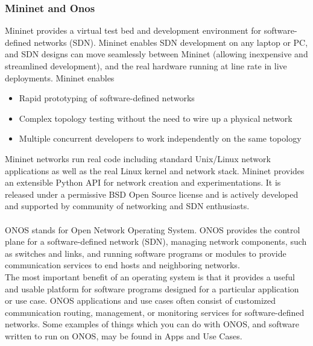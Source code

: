 {{{\subsubsection{Mininet and Onos}{
Mininet provides a virtual test bed and development environment for software-defined networks (SDN). Mininet enables SDN development on any laptop or PC, and SDN designs can move seamlessly between Mininet (allowing inexpensive and streamlined development), and the real hardware running at line rate in live deployments. Mininet enables
\begin{itemize}
\item Rapid prototyping of software-defined networks
\item Complex topology testing without the need to wire up a physical network
\item Multiple concurrent developers to work independently on the same topology
\end{itemize}
Mininet networks run real code including standard Unix/Linux network applications as well as the real Linux kernel and network stack.
Mininet provides an extensible Python API for network creation and experimentations. It is released under a permissive BSD Open Source license and is actively developed and supported by community of networking and SDN enthusiasts.\\\\
ONOS stands for Open Network Operating System. ONOS provides the control plane for a software-defined network (SDN), managing network components, such as switches and links, and running software programs or modules to provide communication services to end hosts and neighboring networks.\\The most important benefit of an operating system is that it provides a useful and usable platform for software programs designed for a particular application or use case. ONOS applications and use cases often consist of customized communication routing, management, or monitoring services for software-defined networks. Some examples of things which you can do with ONOS, and software written to run on ONOS, may be found in Apps and Use Cases.
}
}}}
